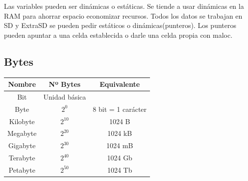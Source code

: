 \documentclass{templateNote}
\begin{document}
\noindent Las variables pueden ser dinámicas o estáticas. Se tiende a usar dinámicas en la RAM para ahorrar espacio economizar recursos. Todos los datos se trabajan en 
SD y ExtraSD se pueden pedir estáticos o dinámicas(punteros). Los punteros pueden apuntar a una celda establecida o darle una celda propia con maloc.
\newpage

\subsection*{\textbf{Bytes}}
\begin{table} [h]
    \centering
        \renewcommand{\arraystretch}{1.5} %
        \begin{tabular}{|c|c|c|}
            \hline
            \textbf{Nombre} & \textbf{Nº Bytes} & \textbf{Equivalente}\\
            \hline
            Bit & Unidad básica &\\
            \hline
            Byte & $\displaystyle 2^0$ & 8 bit = 1 carácter \\
            \hline
            Kilobyte & $\displaystyle 2^{10}$ & 1024 B \\
            \hline
            Megabyte & $\displaystyle 2^{20}$ & 1024 kB \\
            \hline
            Gigabyte & $\displaystyle 2^{30}$ & 1024 mB \\
            \hline
            Terabyte & $\displaystyle 2^{40}$ & 1024 Gb \\
            \hline
            Petabyte & $\displaystyle 2^{50}$ & 1024 Tb \\
            \hline
        \end{tabular}
    \label{tab:componentes}
\end{table}
\end{document}
